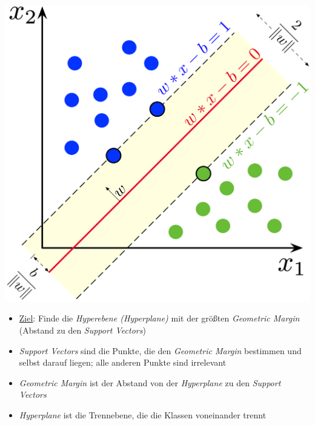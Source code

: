 \begin{minipage}{0.4\textwidth}
    \includegraphics[width=\linewidth]{optimierung/SVM_margin.png}
\end{minipage}
\hfill
\begin{minipage}{0.5\textwidth}
    \begin{itemize}
        \item \underline{Ziel}: Finde die \emph{Hyperebene (Hyperplane)} mit der größten \emph{Geometric Margin} (Abstand zu den \emph{Support Vectors})
        \item \emph{Support Vectors} sind die Punkte, die den \emph{Geometric Margin} bestimmen und selbst darauf liegen; alle anderen Punkte sind irrelevant
        \item \emph{Geometric Margin} ist der Abstand von der \emph{Hyperplane} zu den \emph{Support Vectors}
        \item \emph{Hyperplane} ist die Trennebene, die die Klassen voneinander trennt
    \end{itemize}
\end{minipage}

